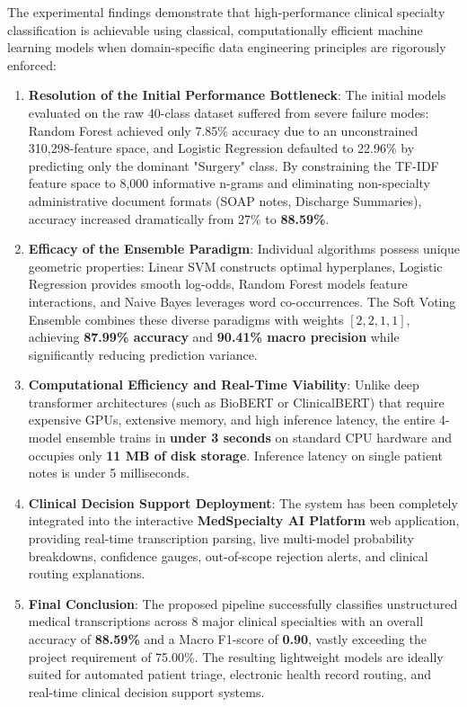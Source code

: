 The experimental findings demonstrate that high-performance clinical specialty classification is achievable using classical, computationally efficient machine learning models when domain-specific data engineering principles are rigorously enforced:

\begin{enumerate}
    \item \textbf{Resolution of the Initial Performance Bottleneck}:
    The initial models evaluated on the raw 40-class dataset suffered from severe failure modes: Random Forest achieved only 7.85\% accuracy due to an unconstrained 310,298-feature space, and Logistic Regression defaulted to 22.96\% by predicting only the dominant "Surgery" class. 
    By constraining the TF-IDF feature space to 8,000 informative n-grams and eliminating non-specialty administrative document formats (SOAP notes, Discharge Summaries), accuracy increased dramatically from 27\% to \textbf{88.59\%}.

    \item \textbf{Efficacy of the Ensemble Paradigm}:
    Individual algorithms possess unique geometric properties: Linear SVM constructs optimal hyperplanes, Logistic Regression provides smooth log-odds, Random Forest models feature interactions, and Naive Bayes leverages word co-occurrences. The Soft Voting Ensemble combines these diverse paradigms with weights $[2, 2, 1, 1]$, achieving \textbf{87.99\% accuracy} and \textbf{90.41\% macro precision} while significantly reducing prediction variance.

    \item \textbf{Computational Efficiency and Real-Time Viability}:
    Unlike deep transformer architectures (such as BioBERT or ClinicalBERT) that require expensive GPUs, extensive memory, and high inference latency, the entire 4-model ensemble trains in \textbf{under 3 seconds} on standard CPU hardware and occupies only \textbf{11 MB of disk storage}. Inference latency on single patient notes is under 5 milliseconds.

    \item \textbf{Clinical Decision Support Deployment}:
    The system has been completely integrated into the interactive \textbf{MedSpecialty AI Platform} web application, providing real-time transcription parsing, live multi-model probability breakdowns, confidence gauges, out-of-scope rejection alerts, and clinical routing explanations.

    \item \textbf{Final Conclusion}:
    The proposed pipeline successfully classifies unstructured medical transcriptions across 8 major clinical specialties with an overall accuracy of \textbf{88.59\%} and a Macro F1-score of \textbf{0.90}, vastly exceeding the project requirement of 75.00\%. The resulting lightweight models are ideally suited for automated patient triage, electronic health record routing, and real-time clinical decision support systems.
\end{enumerate}
